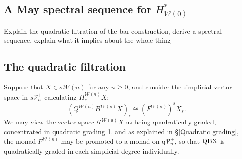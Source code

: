 \documentclass[11pt]{amsart} \renewcommand{\baselinestretch}{1.4}
\theoremstyle{plain}
\theoremstyle{definition}
\newcommand{\calW}{\mathcal{W}}
\newcommand{\calU}{\mathcal{U}}
\newcommand{\calV}{\mathcal{V}}
\newcommand{\calw}{\mathcal{W}}
\newcommand{\vect}[2]{\calV^{#1}_{#2}}
\newcommand{\quadgrad}[1]{\mathrm{q}_{#1}}
\begin{document}
\begin{May sseq and vanishing line}
\section{\textbf{A May spectral sequence for $H^*_{\calw(0)}$}}
\label{May sseq and vanishing line}
{Explain the quadratic filtration of the bar construction, derive a spectral sequence, explain what it implies about the whole thing}

\subsection{The quadratic filtration}

Suppose that $X\in s\calw(n)$ for any $n\geq0$, and consider the simplicial vector space in $s\vect{+}{n}$ calculating $H_*^{\calw(n)}X$:
\[(Q^{\calw(n)}B^{\calw(n)}X)_s\cong (F^{\calw(n)})^{s}X_{s}.\] We may view the vector space $\calU^{\calw(n)}X$ as being quadratically graded, concentrated in quadratic grading 1, and as explained in \S\ref{Quadratic grading}, the monad $F^{\calW(n)}$ may be promoted to a monad on $\quadgrad{}\vect{+}{n}$, so that $\textup{QBX}$ is quadratically graded in each simplicial degree individually.


\end{May sseq and vanishing line}
\end{document}
